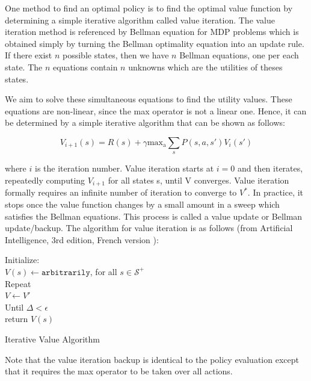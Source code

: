 \documentclass[a4paper, 12pt]{report}
\begin{document}
One method to find an optimal policy is to find the optimal value function by determining a simple iterative algorithm called value iteration.
The value iteration method is referenced by Bellman equation for MDP problems which is obtained simply by turning the Bellman optimality equation into an update rule.
If there exist $n$ possible states, then we have $n$ Bellman equations, one per each state.
The $n$ equations contain $n$ unknowns which are the utilities of theses states. 

We aim to solve these simultaneous equations to find the utility values.
These equations are non-linear, since the max operator is not a linear one.
Hence, it can be determined by a simple iterative algorithm that can be shown as follows:

\[V_{i+1}(s) = R(s) + \gamma \mathrm{max_a} \sum_s P(s,a,s') V_{i}(s')\]

where $i$ is the iteration number.
Value iteration starts at $i = 0$ and then iterates, repeatedly computing $V_{i+1}$ for all states s, until V converges.
Value iteration formally requires an infinite number of iteration to converge to $V^*$.
In practice, it stops once the value function changes by a small amount in a sweep which satisfies the Bellman equations.
This process is called a value update or Bellman update/backup. 
The algorithm for value iteration is as follows (from Artificial Intelligence, 3rd edition, French version \cite{Russell-2010}):

  
\begin{algorithm}[H]
    Initialize:\\  
    $V(s) \gets \texttt{arbitrarily}$, for all $s \in \mathcal S^+$\\
    Repeat\\
    $V \gets V'$ \\
    Until {$\Delta < \epsilon$}\\
    return $V(s)$
\caption{Iterative Value Algorithm}
\end{algorithm}

Note that the value iteration backup is identical to the policy evaluation except that it requires the max operator to be taken over all actions.
\end{document}
